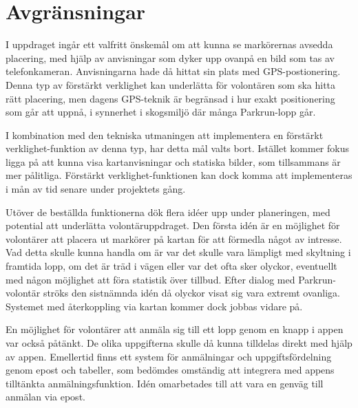 \section{Avgränsningar}
I uppdraget ingår ett valfritt önskemål om att kunna se markörernas avsedda placering, med hjälp av anvisningar som dyker upp ovanpå en bild som tas av telefonkameran. 
Anvisningarna hade då hittat sin plats med GPS-postionering.
Denna typ av förstärkt verklighet kan underlätta för volontären som ska hitta rätt placering, men dagens GPS-teknik är begränsad i hur exakt positionering som går att uppnå, i synnerhet i skogsmiljö där många Parkrun-lopp går.

I kombination med den tekniska utmaningen att implementera en förstärkt verklighet-funktion av denna typ, har detta mål valts bort.
Istället kommer fokus ligga på att kunna visa kartanvisningar och statiska bilder, som tillsammans är mer pålitliga. 
Förstärkt verklighet-funktionen kan dock komma att implementeras i mån av tid senare under projektets gång.

Utöver de beställda funktionerna dök flera idéer upp under planeringen, med potential att underlätta %
volontäruppdraget.
Den första idén är en möjlighet för volontärer att placera ut markörer på kartan för att förmedla något av intresse. 
Vad detta skulle kunna handla om är var det skulle vara lämpligt med skyltning i framtida lopp, om det är träd i vägen eller var det ofta sker olyckor, eventuellt med någon möjlighet att föra statistik över tillbud.
Efter dialog med Parkrun-volontär ströks den sistnämnda idén då olyckor visat sig vara extremt ovanliga.
Systemet med återkoppling via kartan kommer dock jobbas vidare på.

En möjlighet för volontärer att anmäla sig till ett lopp genom en knapp i appen var också påtänkt. 
De olika uppgifterna skulle då kunna tilldelas direkt med hjälp av appen. 
Emellertid finns ett system för anmälningar och uppgiftsfördelning genom epost och tabeller, som bedömdes omständig att integrera med appens tilltänkta anmälningsfunktion.
Idén omarbetades till att vara en genväg till anmälan via epost.
